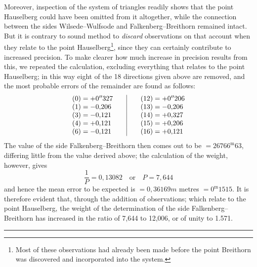 Moreover, inspection of the system of triangles readily shows that the point Hauselberg could have been omitted from it altogether, while the connection between the sides Wilsede–Wulfsode and Falkenberg–Breithorn remained intact. But it is contrary to sound method to \textit{discard} observations on that account when they relate to the point Hauselberg\footnote{Most of these observations had already been made before the point Breithorn was discovered and incorporated into the system.}, since they can certainly contribute to increased precision. To make clearer how much increase in precision results from this, we repeated the calculation, excluding everything that relates to the point Hauselberg; in this way eight of the 18 directions given above are removed, and the most probable errors of the remainder are found as follows:
\[
\begin{array}{r@{\;}l@{\qquad}|@{\qquad}r@{\;}l}
(0)=&+0''327&(12)=&+0''206\\
(1)=&-0{,}206&(13)=&-0{,}206\\
(3)=&-0{,}121&(14)=&+0{,}327\\
(4)=&+0{,}121&(15)=&+0{,}206\\
(6)=&-0{,}121&(16)=&+0{,}121
\end{array}
\]
The value of the side Falkenberg–Breithorn then comes out to be \(=26766^{\mathrm m}63\), differing little from the value derived above; the calculation of the weight, however, gives
\[
\frac1P=0{,}13082\quad\text{or}\quad P=7{,}644
\]
and hence the mean error to be expected is \(=0{,}36169m\) metres \(=0^{\mathrm m}1515\). It is therefore evident that, through the addition of observations; which relate to the point Hauselberg, the weight of the determination of the side Falkenberg–Breithorn has increased in the ratio of 7,644 to 12,006, or of unity to 1.571.
\par\medskip\begin{center}\rule{.28\textwidth}{.3pt}\end{center}
